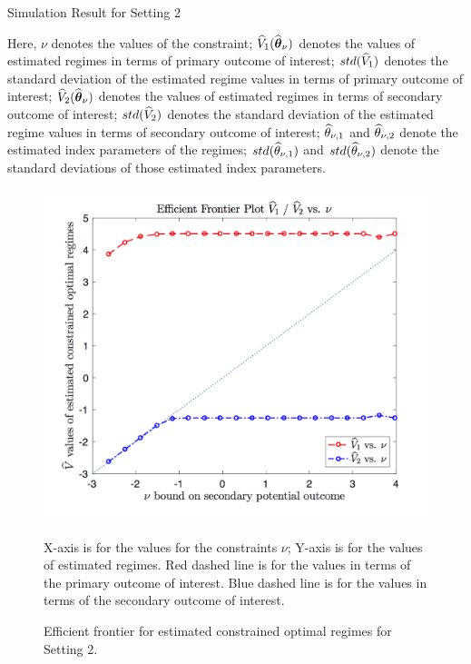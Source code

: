 \begin{table}[!htbp]
	\caption {Simulation Result for Setting 2}
	\centering
	{\tt
		
	}
	\justify
	Here, $\nu$ denotes the values of the constraint; $\widehat{V}_1(\widehat{\boldsymbol{\theta}}_{\nu})$ denotes the values of estimated regimes in terms of primary outcome of interest; $std(\widehat{V}_1)$ denotes the standard deviation of the estimated regime values in terms of primary outcome of interest; $\widehat{V}_2(\widehat{\boldsymbol{\theta}}_{\nu})$ denotes the values of estimated regimes in terms of secondary outcome of interest; $std(\widehat{V}_2)$ denotes the standard deviation of the estimated regime values in terms of secondary outcome of interest; $\widehat{\theta}_{\nu,1}$ and $\widehat{\theta}_{\nu,2}$ denote the estimated index parameters of the regimes; $std(\widehat{\theta}_{\nu,1})$ and $std(\widehat{\theta}_{\nu,2})$ denote the standard deviations of those estimated index parameters.	
\end{table} 
\begin{figure}[!htb]
	\centering
	\includegraphics[width=.9\linewidth]{./Chapter-1/figs/efficient_plot2.png}
	\caption{Efficient frontier for estimated constrained optimal regimes for Setting 2.}
	\label{fig:2}
	\justify
X-axis is for the values for the constraints $\nu$; Y-axis is for the values of estimated regimes. Red dashed line is for the values in terms of the primary outcome of interest. Blue dashed line is for the values in terms of the secondary outcome of interest.
\end{figure}
